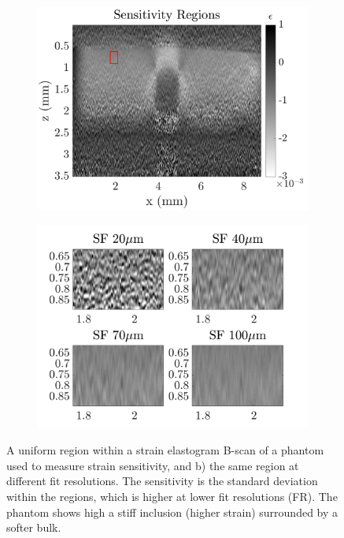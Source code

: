 \begin{figure}	
	\centering
	\begin{subfigure}{0.49\textwidth}
		\centering
		\includegraphics[width=\textwidth]{strainreview_figs/sensitivity_regions.png}
	\end{subfigure}
	\begin{subfigure}{0.49\textwidth}
		\centering
		\includegraphics[width=\textwidth]{strainreview_figs/regions_zoomed.png}
	\end{subfigure}
	\caption{A uniform region within a strain elastogram B-scan of a phantom used to measure strain sensitivity, and b) the same region at different fit resolutions. The sensitivity is the standard deviation within the regions, which is higher at lower fit resolutions (FR). The phantom shows high a stiff inclusion (higher strain) surrounded by a softer bulk.}
	\label{sensitivity_region}
\end{figure}

